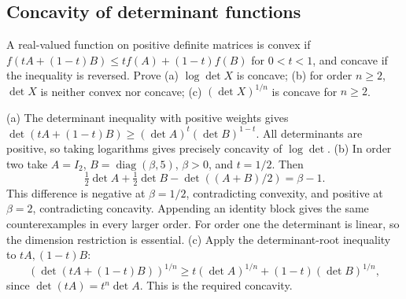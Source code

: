 \subsection*{Concavity of determinant functions}
\begin{problem}\label{ex:12:ineq-ma13-66}
A real-valued function on positive definite matrices is convex if
\(f(tA+(1-t)B)\leqslant tf(A)+(1-t)f(B)\) for \(0<t<1\), and concave
if the inequality is reversed. Prove (a) \(\log\det X\) is concave;
(b) for order \(n\geqslant2\), \(\det X\) is neither convex nor concave;
(c) \((\det X)^{1/n}\) is concave for \(n\geqslant2\).
\end{problem}
\begin{solution}
(a) The determinant inequality with positive weights gives
\(\det(tA+(1-t)B)\geqslant(\det A)^t(\det B)^{1-t}\).
All determinants are positive, so taking logarithms gives precisely
concavity of \(\log\det\).
(b) In order two take \(A=I_2\), \(B=\operatorname{diag}(\beta,5)\),
\(\beta>0\), and \(t=1/2\). Then
\[
\tfrac12\det A+\tfrac12\det B-\det((A+B)/2)=\beta-1.
\]
This difference is negative at \(\beta=1/2\), contradicting convexity,
and positive at \(\beta=2\), contradicting concavity.
Appending an identity block gives the same counterexamples in every
larger order. For order one the determinant is linear, so the dimension
restriction is essential.
(c) Apply the determinant-root inequality to \(tA,(1-t)B\):
\[
(\det(tA+(1-t)B))^{1/n}
\geqslant t(\det A)^{1/n}+(1-t)(\det B)^{1/n},
\]
since \(\det(tA)=t^n\det A\). This is the required concavity.
\end{solution}

